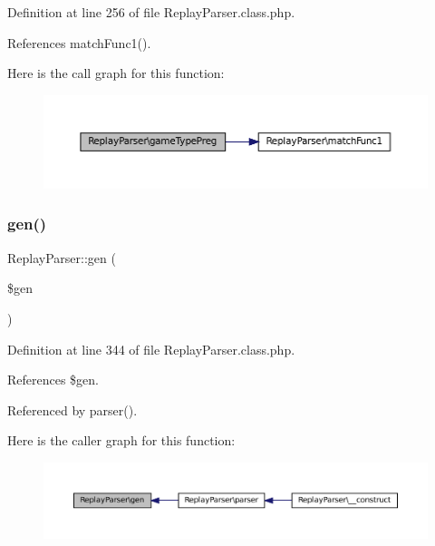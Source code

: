 Definition at line 256 of file Replay\+Parser.\+class.\+php.



References match\+Func1().

Here is the call graph for this function\+:\nopagebreak
\begin{figure}[H]
\begin{center}
\leavevmode
\includegraphics[width=350pt]{class_replay_parser_abbcd249f3c369dc35386fc203bd7dc74_cgraph}
\end{center}
\end{figure}
\mbox{\label{class_replay_parser_a5e8c15fd657011be38f1d7609395cd6d}} 
\subsubsection{\texorpdfstring{gen()}{gen()}}
{\footnotesize\ttfamily Replay\+Parser\+::gen (\begin{DoxyParamCaption}\item[{}]{\$gen }\end{DoxyParamCaption})}



Definition at line 344 of file Replay\+Parser.\+class.\+php.



References \$gen.



Referenced by parser().

Here is the caller graph for this function\+:\nopagebreak
\begin{figure}[H]
\begin{center}
\leavevmode
\includegraphics[width=350pt]{class_replay_parser_a5e8c15fd657011be38f1d7609395cd6d_icgraph}
\end{center}
\end{figure}
\mbox{\label{class_replay_parser_a743e78021b6754ea36c804074e07da2d}} 
